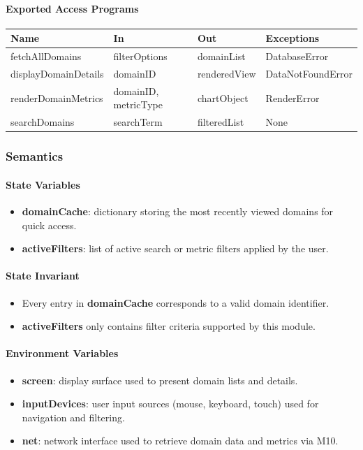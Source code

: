 \documentclass[12pt, titlepage]{article}
\begin{document}
\paragraph{Exported Access Programs}
\begin{center}
\renewcommand{\arraystretch}{1.2}
\begin{tabularx}{\textwidth}{l X X l}
\toprule
\textbf{Name} & \textbf{In} & \textbf{Out} & \textbf{Exceptions}\\
\midrule
fetchAllDomains & filterOptions & domainList & DatabaseError \\
displayDomainDetails & domainID & renderedView & DataNotFoundError \\
renderDomainMetrics & domainID, metricType & chartObject & RenderError \\
searchDomains & searchTerm & filteredList & None \\
\bottomrule
\end{tabularx}
\end{center}

\subsubsection{Semantics}

\paragraph{State Variables}
\begin{itemize}
  \item \textbf{domainCache}: dictionary storing the most recently viewed domains for quick access.
  \item \textbf{activeFilters}: list of active search or metric filters applied by the user.
\end{itemize}

\paragraph{State Invariant}
\begin{itemize}
  \item Every entry in \textbf{domainCache} corresponds to a valid domain identifier.
  \item \textbf{activeFilters} only contains filter criteria supported by this module.
\end{itemize}


\paragraph{Environment Variables}
\begin{itemize}
  \item \textbf{screen}: display surface used to present domain lists and details.
  \item \textbf{inputDevices}: user input sources (mouse, keyboard, touch) used for navigation and filtering.
  \item \textbf{net}: network interface used to retrieve domain data and metrics via M10.
\end{itemize}
\end{document}
